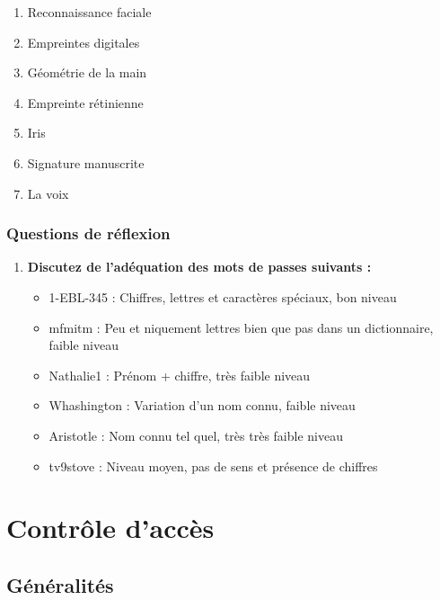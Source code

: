 \documentclass{report}
\begin{document}
\begin{itemize}
					\begin{enumerate}
						\item Reconnaissance faciale
						\item Empreintes digitales
						\item Géométrie de la main
						\item Empreinte rétinienne
						\item Iris
						\item Signature manuscrite
						\item La voix\\
					\end{enumerate}

			\end{itemize}
				

		\subsection{Questions de réflexion}

			\begin{enumerate}
				\item \textbf{Discutez de l'adéquation des mots de passes suivants :}\\
					\begin{itemize}
						\item 1-EBL-345 : Chiffres, lettres et caractères spéciaux, bon niveau
						\item mfmitm : Peu et niquement lettres bien que pas dans un dictionnaire, faible niveau
						\item Nathalie1 : Prénom + chiffre, très faible niveau
						\item Whashington : Variation d'un nom connu, faible niveau
						\item Aristotle : Nom connu tel quel, très très faible niveau
						\item tv9stove : Niveau moyen, pas de sens et présence de chiffres
					\end{itemize}
			\end{enumerate}

\chapter{Contrôle d'accès}

	\section{Généralités}
\end{document}
